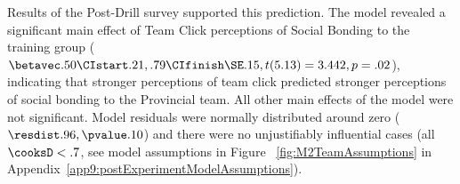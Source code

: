 








Results of the Post-Drill survey supported this prediction. The model revealed a significant main effect of Team Click perceptions of Social Bonding to the training group ($\betavec .50 \CIstart .21, .79 \CIfinish \SE .15, t(5.13) = 3.442, p = .02$), indicating that stronger perceptions of team click predicted stronger perceptions of social bonding to the Provincial team.  All other main effects of the model were not significant.  Model residuals were normally distributed around zero ($\resdist .96, \pvalue .10$) and there were no unjustifiably influential cases (all $\cooksD < .7$, see model assumptions in Figure ~\ref{fig:M2TeamAssumptions} in Appendix~\ref{app9:postExperimentModelAssumptions}).




